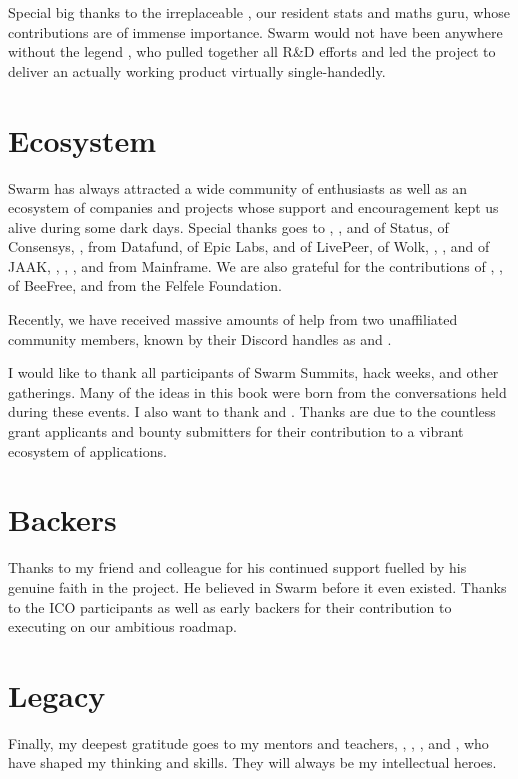 Special big thanks to the irreplaceable , our resident stats and maths guru, whose contributions are of immense importance. Swarm would not have been anywhere without the legend , who pulled together all R\&D efforts and led the project to deliver an actually working product virtually single-handedly.



\section*{Ecosystem}

Swarm has always attracted a wide community of enthusiasts as well as an ecosystem of companies and projects whose support and encouragement kept us alive during some dark days. 
Special thanks goes to , , and  of Status,  of Consensys, ,  from Datafund,  of Epic Labs,  and  of LivePeer,  of Wolk, , ,  and  of JAAK, , , , and  from Mainframe. We are also grateful for the contributions of , ,  of BeeFree, and  from the Felfele Foundation. 

Recently, we have received massive amounts of help from two unaffiliated community members, known by their Discord handles as  and .

I would like to thank all participants of Swarm Summits, hack weeks, and other gatherings. Many of the ideas in this book were born from the conversations held during these events. I also want to thank  and . Thanks are due to the countless grant applicants and bounty submitters for their contribution to a vibrant ecosystem of applications.

\section*{Backers}
Thanks to my friend and colleague  for his continued support fuelled by his genuine faith in the project. He believed in Swarm before it even existed. Thanks to the ICO participants as well as early backers for their contribution to executing on our ambitious roadmap.

\section*{Legacy}

Finally, my deepest gratitude goes to my mentors and teachers, , , , and , who have shaped my thinking and skills. They will always be my intellectual heroes.


